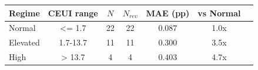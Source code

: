 \begin{tabular}{lcccccc}
\toprule
Regime & CEUI range & $N$ & $N_{rev}$ & MAE (pp) & vs Normal \\
\midrule
Normal & <= 1.7 & 22 & 22 & 0.087 & 1.0x \\
Elevated & 1.7-13.7 & 11 & 11 & 0.300 & 3.5x \\
High & > 13.7 & 4 & 4 & 0.403 & 4.7x \\
\bottomrule
\end{tabular}
